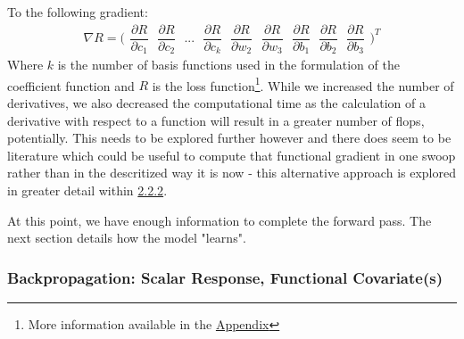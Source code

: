 \documentclass{article}
\begin{document}
\noindent To the following gradient:
\[\nabla R = \Bigg( \begin{array}{cc}

\dfrac{\partial R}{\partial c_{1}} \ \ \
\dfrac{\partial R}{\partial c_{2}} \ \ \ 
... \ \ \ 
\dfrac{\partial R}{\partial c_{k}} \ \ \
\dfrac{\partial R}{\partial w_{2}} \ \ \
\dfrac{\partial R}{\partial w_{3}} \ \ \
\dfrac{\partial R}{\partial b_{1}} \ \ \ 
\dfrac{\partial R}{\partial b_{2}} \ \ \
\dfrac{\partial R}{\partial b_{3}}
\end{array} \Bigg)^{T}\]
\noindent Where $k$ is the number of basis functions used in the formulation of the coefficient function and $R$ is the loss function\footnote{More information available in the \hyperref[sec:nn]{Appendix}}. While we increased the number of derivatives, we also decreased the computational time as the calculation of a derivative with respect to a function will result in a greater number of flops, potentially. This needs to be explored further however and there does seem to be literature which could be useful to compute that functional gradient in one swoop rather than in the descritized way it is now - this alternative approach is explored in greater detail within \hyperref[sec:backpropResFuncNN]{2.2.2}. 

\noindent At this point, we have enough information to complete the forward pass. The next section details how the model "learns".

\subsubsection{Backpropagation: Scalar Response, Functional Covariate(s)}
\end{document}
